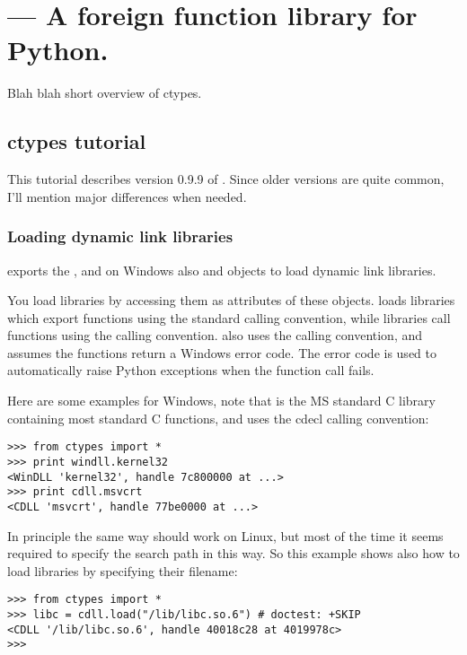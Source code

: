 \ifx\locallinewidth\undefined\newlength{\locallinewidth}\fi
\setlength{\locallinewidth}{\linewidth}
\section{ --- A foreign function library for Python.}

Blah blah short overview of ctypes.


\subsection{ctypes tutorial\label{ctypes-ctypes-tutorial}}

This tutorial describes version 0.9.9 of .
Since older versions are quite common, I'll mention major differences
when needed.


\subsubsection{Loading dynamic link libraries\label{ctypes-loading-dynamic-link-libraries}}

 exports the , and on Windows also  and
 objects to load dynamic link libraries.

You load libraries by accessing them as attributes of these objects.
 loads libraries which export functions using the standard
 calling convention, while  libraries call
functions using the  calling convention.  also
uses the  calling convention, and assumes the functions
return a Windows  error code. The error code is used to
automatically raise  Python exceptions when the
function call fails.

Here are some examples for Windows, note that  is the MS
standard C library containing most standard C functions, and uses the
cdecl calling convention:
\begin{verbatim}
>>> from ctypes import *
>>> print windll.kernel32
<WinDLL 'kernel32', handle 7c800000 at ...>
>>> print cdll.msvcrt
<CDLL 'msvcrt', handle 77be0000 at ...>
\end{verbatim}

In principle the same way should work on Linux, but most of the time
it seems required to specify the search path in this way. So this
example shows also how to load libraries by specifying their
filename:
\begin{verbatim}
>>> from ctypes import *
>>> libc = cdll.load("/lib/libc.so.6") # doctest: +SKIP
<CDLL '/lib/libc.so.6', handle 40018c28 at 4019978c>
>>>
\end{verbatim}

